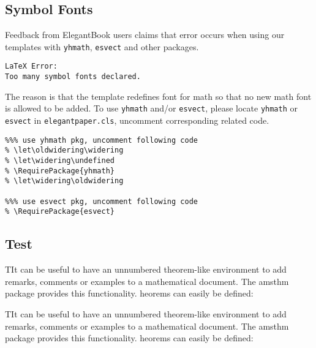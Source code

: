 \documentclass[11pt,en,cite=authoryear]{elegantpaper}
\begin{document}
\subsection{Symbol Fonts}
Feedback from ElegantBook users claims that error occurs when using our templates with  \lstinline{yhmath}, \lstinline{esvect} and other packages.
\begin{lstlisting}
LaTeX Error:
Too many symbol fonts declared.
\end{lstlisting}

The reason is that the template redefines font for math so that no new math font is allowed to be added. To use \lstinline{yhmath} and/or \lstinline{esvect}, please locate \lstinline{yhmath} or \lstinline{esvect} in \lstinline{elegantpaper.cls}, uncomment corresponding related code.

\begin{lstlisting}
%%% use yhmath pkg, uncomment following code
% \let\oldwidering\widering
% \let\widering\undefined
% \RequirePackage{yhmath}
% \let\widering\oldwidering

%%% use esvect pkg, uncomment following code
% \RequirePackage{esvect}
\end{lstlisting}

\subsection{Test}
TIt can be useful to have an unnumbered theorem-like environment to add remarks, comments or examples to a mathematical document. The amsthm package provides this functionality. heorems can easily be defined:

TIt can be useful to have an unnumbered theorem-like environment to add remarks, comments or examples to a mathematical document. The amsthm package provides this functionality. heorems can easily be defined:
\end{document}
